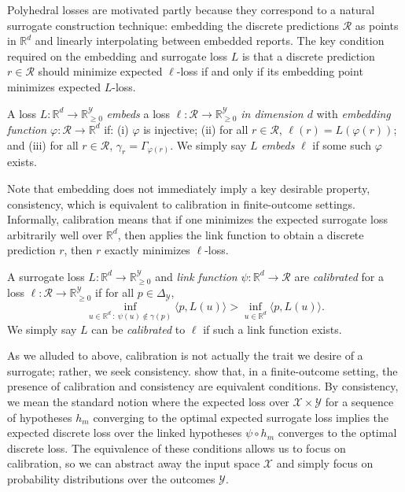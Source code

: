\documentclass[final]{colt2020} %
\newcommand{\reals}{\mathbb{R}}
\newcommand{\nonnegreals}{\reals_{\geq 0}}%
\newcommand{\simplex}{\Delta_\Y}
\newcommand{\R}{\mathcal{R}}
\newcommand{\X}{\mathcal{X}}
\newcommand{\Y}{\mathcal{Y}}
\newcommand{\inprod}[2]{\langle #1, #2 \rangle}%
\begin{document}
Polyhedral losses are motivated partly because they correspond to a natural surrogate construction technique: embedding the discrete predictions $\R$ as points in $\reals^d$ and linearly interpolating between embedded reports.
The key condition required on the embedding and surrogate loss $L$ is that a discrete prediction $r \in \R$ should minimize expected $\ell$-loss if and only if its embedding point minimizes expected $L$-loss.
%
\begin{definition}
  A loss $L: \reals^d \to \nonnegreals^{\Y}$ \emph{embeds} a loss $\ell: \R \to \nonnegreals^{\Y}$ \emph{in dimension $d$} with \emph{embedding function $\varphi: \R \to \reals^d$} if: (i) $\varphi$ is injective; (ii) for all $r \in \R$, $\ell(r) = L(\varphi(r))$; and (iii) for all $r \in \R$, $\gamma_r = \Gamma_{\varphi(r)}$.
  We simply say $L$ \emph{embeds} $\ell$ if some such $\varphi$ exists.
\end{definition}
%
Note that embedding does not immediately imply a key desirable property, consistency, which is equivalent to calibration in finite-outcome settings.
Informally, calibration means that if one minimizes the expected surrogate loss arbitrarily well over $\reals^d$, then applies the link function to obtain a discrete prediction $r$, then $r$ exactly minimizes $\ell$-loss.
\begin{definition}\label{def:calibration}
  A surrogate loss $L: \reals^d \to \nonnegreals^{\Y}$ and \emph{link function} $\psi: \reals^d \to \R$ are \emph{calibrated} for a loss $\ell: \R \to \nonnegreals^{\Y}$ if for all $p \in \simplex$,
    \[ \inf_{u \in \reals^d ~:~ \psi(u) \not\in \gamma(p)} \inprod{p}{L(u)}  > \inf_{u \in \reals^d} \inprod{p}{L(u)}  .\]
  We simply say $L$ can be \emph{calibrated} to $\ell$ if such a link function exists.
\end{definition}
As we alluded to above, calibration is not actually the trait we desire of a surrogate; rather, we seek consistency.
\citet{bartlett2006convexity,tewari2007consistency} show that, in a finite-outcome setting, the presence of calibration and consistency are equivalent conditions.
By consistency, we mean the standard notion where the expected loss over $\X \times \Y$ for a sequence of hypotheses $h_m$ converging to the optimal expected surrogate loss implies the expected discrete loss over the linked hypotheses $\psi \circ h_m$ converges to the optimal discrete loss.
The equivalence of these conditions allows us to focus on calibration, so we can abstract away the input space $\X$ and simply focus on probability distributions over the outcomes $\Y$.
\end{document}
